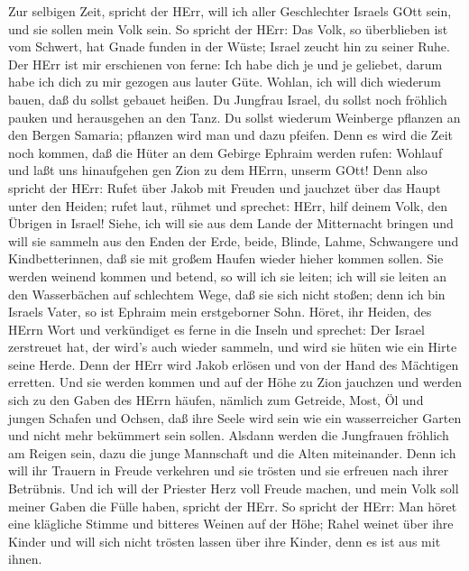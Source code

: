  Zur selbigen Zeit, spricht der HErr, will ich aller
Geschlechter Israels GOtt sein, und sie sollen mein Volk sein.
 So spricht der HErr: Das Volk, so überblieben ist vom
Schwert, hat Gnade funden in der Wüste; Israel zeucht hin zu seiner
Ruhe.  Der HErr ist mir erschienen von ferne: Ich habe dich
je und je geliebet, darum habe ich dich zu mir gezogen aus lauter Güte.
 Wohlan, ich will dich wiederum bauen, daß du sollst gebauet
heißen. Du Jungfrau Israel, du sollst noch fröhlich pauken und
herausgehen an den Tanz.  Du sollst wiederum Weinberge
pflanzen an den Bergen Samaria; pflanzen wird man und dazu pfeifen.
 Denn es wird die Zeit noch kommen, daß die Hüter an dem
Gebirge Ephraim werden rufen: Wohlauf und laßt uns hinaufgehen gen Zion
zu dem HErrn, unserm GOtt!  Denn also spricht der HErr:
Rufet über Jakob mit Freuden und jauchzet über das Haupt unter den
Heiden; rufet laut, rühmet und sprechet: HErr, hilf deinem Volk, den
Übrigen in Israel!  Siehe, ich will sie aus dem Lande der
Mitternacht bringen und will sie sammeln aus den Enden der Erde, beide,
Blinde, Lahme, Schwangere und Kindbetterinnen, daß sie mit großem Haufen
wieder hieher kommen sollen.  Sie werden weinend kommen und
betend, so will ich sie leiten; ich will sie leiten an den Wasserbächen
auf schlechtem Wege, daß sie sich nicht stoßen; denn ich bin Israels
Vater, so ist Ephraim mein erstgeborner Sohn.  Höret, ihr
Heiden, des HErrn Wort und verkündiget es ferne in die Inseln und
sprechet: Der Israel zerstreuet hat, der wird's auch wieder sammeln, und
wird sie hüten wie ein Hirte seine Herde.  Denn der HErr
wird Jakob erlösen und von der Hand des Mächtigen erretten.
 Und sie werden kommen und auf der Höhe zu Zion jauchzen
und werden sich zu den Gaben des HErrn häufen, nämlich zum Getreide,
Most, Öl und jungen Schafen und Ochsen, daß ihre Seele wird sein wie ein
wasserreicher Garten und nicht mehr bekümmert sein sollen. 
Alsdann werden die Jungfrauen fröhlich am Reigen sein, dazu die junge
Mannschaft und die Alten miteinander. Denn ich will ihr Trauern in
Freude verkehren und sie trösten und sie erfreuen nach ihrer Betrübnis.
 Und ich will der Priester Herz voll Freude machen, und
mein Volk soll meiner Gaben die Fülle haben, spricht der HErr.
 So spricht der HErr: Man höret eine klägliche Stimme und
bitteres Weinen auf der Höhe; Rahel weinet über ihre Kinder und will
sich nicht trösten lassen über ihre Kinder, denn es ist aus mit ihnen.
